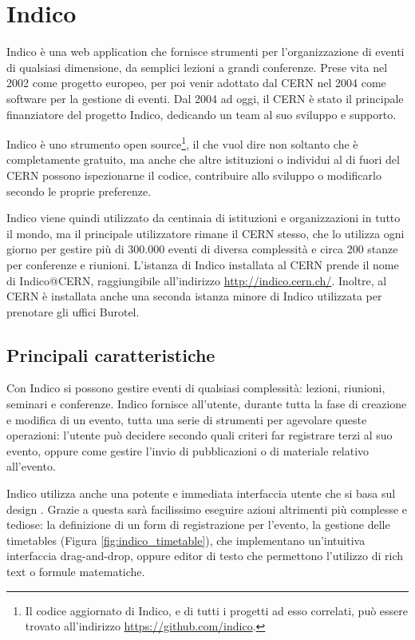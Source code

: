\chapter{Indico} \label{chap:indico}
	
	Indico è una web application che fornisce strumenti per l'organizzazione di eventi di qualsiasi dimensione, da semplici lezioni a grandi conferenze. Prese vita nel 2002 come progetto europeo, per poi venir adottato dal \ac{CERN} nel 2004 come software per la gestione di eventi. Dal 2004 ad oggi, il \ac{CERN} è stato il principale finanziatore del progetto Indico, dedicando un team al suo sviluppo e supporto.
	
	Indico è uno strumento open source\footnote{Il codice aggiornato di Indico, e di tutti i progetti ad esso correlati, può essere trovato all'indirizzo \url{https://github.com/indico}.}, il che vuol dire non soltanto che è completamente gratuito, ma anche che altre istituzioni o individui al di fuori del \ac{CERN} possono ispezionarne il codice, contribuire allo sviluppo o modificarlo secondo le proprie preferenze.
	
	Indico viene quindi utilizzato da centinaia di istituzioni e organizzazioni in tutto il mondo, ma il principale utilizzatore rimane il \ac{CERN} stesso, che lo utilizza ogni giorno per gestire più di 300.000 eventi di diversa complessità e circa 200 stanze per conferenze e riunioni. L'istanza di Indico installata al \ac{CERN} prende il nome di Indico@CERN, raggiungibile all'indirizzo \url{http://indico.cern.ch/}. Inoltre, al \ac{CERN} è installata anche una seconda istanza minore di Indico utilizzata per prenotare gli uffici Burotel.
	
	\section{Principali caratteristiche} \label{sec:i;caratteristiche}
	
		Con Indico si possono gestire eventi di qualsiasi complessità: lezioni, riunioni, seminari e conferenze. Indico fornisce all'utente, durante tutta la fase di creazione e modifica di un evento, tutta una serie di strumenti per agevolare queste operazioni: l'utente può decidere secondo quali criteri far registrare terzi al suo evento, oppure come gestire l'invio di pubblicazioni o di materiale relativo all'evento.
		
		Indico utilizza anche una potente e immediata interfaccia utente che si basa sul design . Grazie a questa  sarà facilissimo eseguire azioni altrimenti più complesse e tediose: la definizione di un form di registrazione per l'evento, la gestione delle timetables (Figura \ref{fig:indico_timetable}), che implementano un'intuitiva interfaccia drag-and-drop, oppure editor di testo che permettono l'utilizzo di rich text o formule matematiche.

